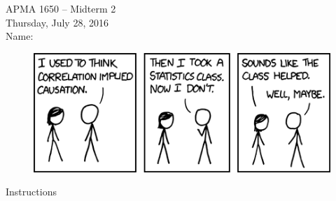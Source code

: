 \documentclass[12pt]{article}
\begin{document}
\title{}
\author{\vspace{-10ex} }

\begin{center}
{\LARGE APMA 1650 -- Midterm 2}\\
\vspace{5mm}
{\large Thursday, July 28, 2016 }\\
\vspace{10mm}
{\large Name: }
\vspace{3cm}

\begin{figure}[H]
\centering
\includegraphics[width=15cm]{correlation}
\end{figure}
\end{center}
\pagebreak

\begin{center}
{\LARGE Instructions}\\
\vspace{5mm}
\end{center}
\end{document}
